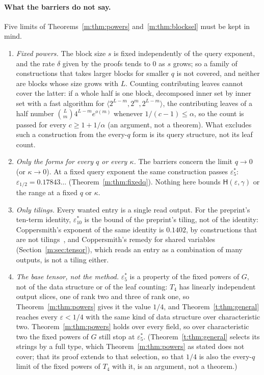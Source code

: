 \documentclass[11pt]{article}
\theoremstyle{definition}
\theoremstyle{remark}
\newcommand{\es}{\varepsilon^*_5}
\newcommand{\et}{\varepsilon^*_{10}}
\newcommand{\Hyp}{\mathsf{H}}
\newcommand{\HypHalfRfourteen}{0.17843}%
\newcommand{\CopTenTerm}{0.1402}%
\begin{document}
\paragraph{What the barriers do not say.} Five limits of Theorems~\ref{m:thm:powers} and~\ref{m:thm:blocksel} must be kept in mind.
\begin{enumerate}[label=(\arabic*),nosep]
\item \emph{Fixed powers.} The block size $s$ is fixed independently of the query exponent, and the rate $\delta$ given by the proofs tends to $0$ as $s$ grows; so a family of constructions that takes larger blocks for smaller $q$ is not covered, and neither are blocks whose size grows with $L$. Counting contributing leaves cannot cover the latter: if a whole half is one block, decomposed inner set by inner set with a fast algorithm for $\langle2^{L-m},2^m,2^{L-m}\rangle$, the contributing leaves of a half number $\binom Lm4^{L-m}e^{o(m)}$ whenever $1/(c-1)\le\alpha$, so the count is passed for every $c\ge1+1/\alpha$ (an argument, not a theorem). What excludes such a construction from the every-$q$ form is its query structure, not its leaf count.
\item \emph{Only the forms for every $q$ or every $\kappa$.} The barriers concern the limit $q\to0$ (or $\kappa\to0$). At a fixed query exponent the same construction passes $\es$: $\varepsilon_{1/2}=\HypHalfRfourteen\ldots$ (Theorem~\ref{m:thm:fixedq}). Nothing here bounds $\Hyp(\varepsilon,\gamma)$ or the range at a fixed $q$ or $\kappa$.
\item \emph{Only tilings.} Every wanted entry is a single read output. For the preprint's ten-term identity, $\et$ is the bound of the preprint's tiling, not of the identity: Coppersmith's exponent of the same identity is $\CopTenTerm$, by constructions that are not tilings~\cite{Cop82,NS24}, and Coppersmith's remedy for shared variables (Section~\ref{m:sec:tensor}), which reads an entry as a combination of many outputs, is not a tiling either.
\item \emph{The base tensor, not the method.} $\es$ is a property of the fixed powers of $G$, not of the data structure or of the leaf counting: $T_4$ has linearly independent output slices, one of rank two and three of rank one, so Theorem~\ref{m:thm:powers} gives it the value $1/4$, and Theorem~\ref{t:thm:general} reaches every $\varepsilon<1/4$ with the same kind of data structure over characteristic two. Theorem~\ref{m:thm:powers} holds over every field, so over characteristic two the fixed powers of $G$ still stop at $\es$. (Theorem~\ref{t:thm:general} selects its strings by a full type, which Theorem~\ref{m:thm:powers} as stated does not cover; that its proof extends to that selection, so that $1/4$ is also the every-$q$ limit of the fixed powers of $T_4$ with it, is an argument, not a theorem.)

\end{enumerate}
\end{document}
